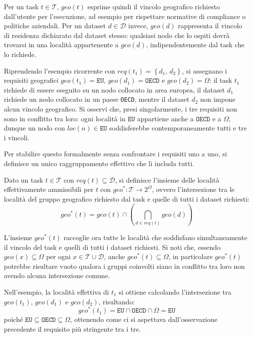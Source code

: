 Per un task $t \in \mathcal{T}$, $geo(t)$ esprime quindi il vincolo geografico richiesto dall'utente per l'esecuzione, ad esempio per rispettare normative di compliance o politiche aziendali. Per un dataset $d \in \mathcal{D}$ invece, $geo(d)$ rappresenta il vincolo di residenza dichiarato dal dataset stesso: qualsiasi nodo che lo ospiti dovrà trovarsi in una località appartenente a $geo(d)$, indipendentemente dal task che lo richiede.

Riprendendo l'esempio ricorrente con $req(t_1) = \left\{ d_1,\, d_2 \right\}$, si assegnano i requisiti geografici $geo(t_1) = \mathtt{EU}$, $geo(d_1) = \mathtt{OECD}$ e $geo(d_2) = \Omega$: il task $t_1$ richiede di essere eseguito su un nodo collocato in area europea, il dataset $d_1$ richiede un nodo collocato in un paese \texttt{OECD}, mentre il dataset $d_2$ non impone alcun vincolo geografico. Si osservi che, presi singolarmente, i tre requisiti non sono in conflitto tra loro: ogni località in $\mathtt{EU}$ appartiene anche a $\mathtt{OECD}$ e a $\Omega$, dunque un nodo con $loc(n) \in \mathtt{EU}$ soddisferebbe contemporaneamente tutti e tre i vincoli. 

Per stabilire questo formalmente senza confrontare i requisiti uno a uno, si definisce un unico raggruppamento effettivo che li includa tutti.

\begin{definition}
    \label{def:localita_effettiva}
    Dato un task $t \in \mathcal{T}$ con $req(t) \subseteq \mathcal{D}$, si definisce l'insieme delle località effettivamente ammissibili per $t$ con $geo^* : \mathcal{T} \rightarrow 2^\Omega$, ovvero l'intersezione tra le località del gruppo geografico richiesto dal task e quelle di tutti i dataset richiesti:
    \begin{equation}
        geo^*(t) = geo(t) \cap \left( \bigcap_{d \in req(t)} geo(d) \right)
    \end{equation}
\end{definition}

L'insieme $geo^*(t)$ raccoglie ora tutte le località che soddisfano simultaneamente il vincolo del task e quelli di tutti i dataset richiesti. Si noti che, essendo $geo(x) \subseteq \Omega$ per ogni $x \in \mathcal{T} \cup \mathcal{D}$, anche $geo^*(t) \subseteq \Omega$, in particolare $geo^*(t)$ potrebbe risultare vuoto qualora i gruppi coinvolti siano in conflitto tra loro non avendo alcuna intersezione comune. 

Nell'esempio, la località effettiva di $t_1$ si ottiene calcolando l'intersezione tra $geo(t_1)$, $geo(d_1)$ e $geo(d_2)$, risultando:
\begin{equation}
    geo^*(t_1) = \mathtt{EU} \cap \mathtt{OECD} \cap \Omega = \mathtt{EU}
\end{equation}
poiché $\mathtt{EU} \subseteq \mathtt{OECD} \subseteq \Omega$, ottenendo come ci si aspettava dall'osservazione precedente il requisito più stringente tra i tre.

